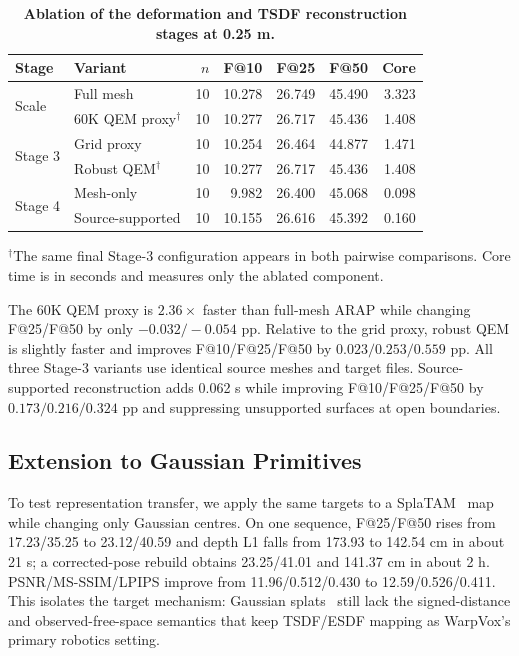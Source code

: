 \begin{table}[t]
\centering
\caption{\textbf{Ablation of the deformation and TSDF reconstruction stages
at 0.25 m.}}
\label{tab:ablation}
\scriptsize
\setlength{\tabcolsep}{0.8pt}
\begin{tabular}{@{}llrrrrr@{}}
\toprule
Stage & Variant & $n$ & F@10 & F@25 & F@50 & Core \\
\midrule
\multirow{2}{*}{Scale}
 & Full mesh & 10 & 10.278 & 26.749 & 45.490 & 3.323 \\
 & 60K QEM proxy$^\dagger$ & 10 & 10.277 & 26.717 & 45.436 & 1.408 \\
\midrule
\multirow{2}{*}{Stage 3}
 & Grid proxy & 10 & 10.254 & 26.464 & 44.877 & 1.471 \\
 & Robust QEM$^\dagger$ & 10 & 10.277 & 26.717 & 45.436 & 1.408 \\
\midrule
\multirow{2}{*}{Stage 4}
 & Mesh-only & 10 & 9.982 & 26.400 & 45.068 & 0.098 \\
 & Source-supported & 10 & 10.155 & 26.616 & 45.392 & 0.160 \\
\bottomrule
\end{tabular}
\vspace{1pt}

\parbox{\columnwidth}{\scriptsize $^\dagger$The same final Stage-3 configuration
appears in both pairwise comparisons. Core time is in seconds and measures only
the ablated component.}
\end{table}

The 60K QEM proxy is $2.36\times$ faster than full-mesh ARAP while changing
F@25/F@50 by only $-0.032/-0.054$ pp. Relative to the grid proxy, robust QEM is
slightly faster and improves F@10/F@25/F@50 by $0.023/0.253/0.559$ pp. All
three Stage-3 variants use identical source meshes and target files.
Source-supported reconstruction adds 0.062 s while improving F@10/F@25/F@50 by
$0.173/0.216/0.324$ pp and suppressing unsupported surfaces at open boundaries.

\subsection{Extension to Gaussian Primitives}

To test representation transfer, we apply the same targets to a
SplaTAM~\cite{keetha2024splatam} map while changing only Gaussian centres.
On one sequence, F@25/F@50 rises from 17.23/35.25 to 23.12/40.59 and depth L1
falls from 173.93 to 142.54 cm in about 21 s; a corrected-pose rebuild obtains
23.25/41.01 and 141.37 cm in about 2 h. PSNR/MS-SSIM/LPIPS improve from
11.96/0.512/0.430 to 12.59/0.526/0.411. This isolates the target mechanism:
Gaussian splats~\cite{kerbl2023gaussians} still lack the signed-distance and
observed-free-space semantics that keep TSDF/ESDF mapping as WarpVox's primary
robotics setting.
